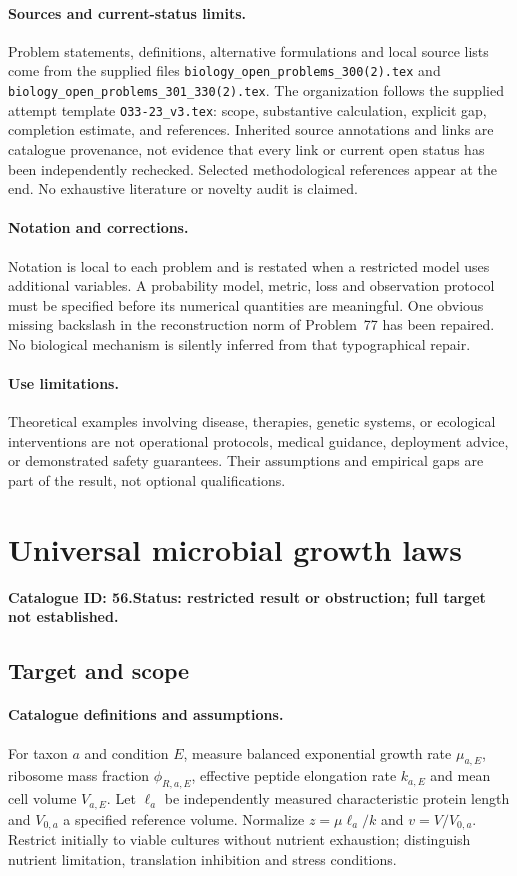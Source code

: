 \documentclass[11pt]{article}
\begin{document}
\paragraph{Sources and current-status limits.}
Problem statements, definitions, alternative formulations and local source lists
come from the supplied files
\texttt{biology\_open\_problems\_300(2).tex} and
\texttt{biology\_open\_problems\_301\_330(2).tex}.
The organization follows the supplied attempt template
\texttt{O33-23\_v3.tex}: scope, substantive calculation, explicit gap,
completion estimate, and references. Inherited source annotations and links are
catalogue provenance, not evidence that every link or current open status has
been independently rechecked. Selected methodological references appear at the
end. No exhaustive literature or novelty audit is claimed.

\paragraph{Notation and corrections.}
Notation is local to each problem and is restated when a restricted model uses
additional variables. A probability model, metric, loss and observation protocol
must be specified before its numerical quantities are meaningful. One obvious
missing backslash in the reconstruction norm of Problem~77 has been repaired.
No biological mechanism is silently inferred from that typographical repair.

\paragraph{Use limitations.}
Theoretical examples involving disease, therapies, genetic systems, or ecological
interventions are not operational protocols, medical guidance, deployment advice,
or demonstrated safety guarantees. Their assumptions and empirical gaps are part
of the result, not optional qualifications.

\setcounter{section}{55}
\section{Universal microbial growth laws}
\label{prob:056}
\noindent\textbf{Catalogue ID: 56.}\quad \textbf{Status: restricted result or obstruction; full target not established.}
\subsection{Target and scope}
\paragraph{Catalogue definitions and assumptions.}
For taxon $a$ and condition $E$, measure balanced exponential growth rate $\mu_{a,E}$, ribosome mass fraction $\phi_{R,a,E}$, effective peptide elongation rate $k_{a,E}$ and mean cell volume $V_{a,E}$. Let $\ell_a$ be independently measured characteristic protein length and $V_{0,a}$ a specified reference volume. Normalize $z=\mu\ell_a/k$ and $v=V/V_{0,a}$. Restrict initially to viable cultures without nutrient exhaustion; distinguish nutrient limitation, translation inhibition and stress conditions.
\end{document}
